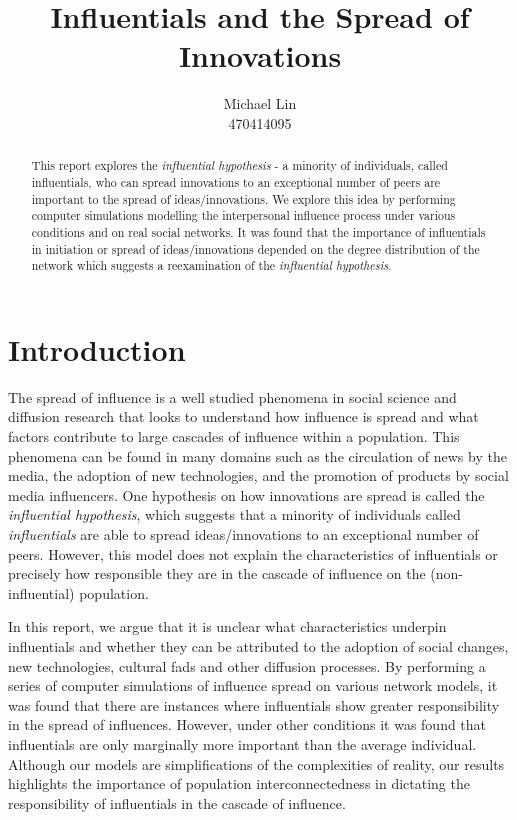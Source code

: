 \documentclass[10pt, oneside, reqno]{amsart}
\title{Influentials and the Spread of Innovations}                                %
\author{Michael Lin\\470414095}
\theoremstyle{plain}%
\theoremstyle{definition}
\theoremstyle{remark}
\begin{document}
\vspace*{-1.5cm}
\begin{abstract}
    This report explores the \textit{influential hypothesis} - a minority of individuals, called 
    influentials, who can spread innovations to an exceptional number of peers are important to 
    the spread of ideas/innovations. We explore this idea by performing computer simulations 
    modelling the interpersonal influence process under various conditions and on real social networks. 
    It was found that the importance of influentials in initiation or spread of ideas/innovations depended on the degree distribution of the network which suggests a reexamination of the \textit{influential hypothesis}.
\end{abstract}
\maketitle 

\section{Introduction}

The spread of influence is a well studied phenomena in social science and diffusion research 
that looks to understand how influence is spread and what factors contribute to large cascades
of influence within a population. 
This phenomena can be found in many domains such as the circulation of news by the media, the 
adoption of new technologies, and the promotion of products by social media influencers.
One hypothesis on how innovations are spread is called the \textit{influential hypothesis}\cite{Influential},
which suggests that a minority of individuals called \textit{influentials} are able to spread 
ideas/innovations to an exceptional number of peers. 
However, this model does not explain the characteristics of influentials or precisely how 
responsible they are in the cascade of influence on the (non-influential) population.

In this report, we argue that it is unclear what characteristics underpin influentials and 
whether they can be attributed to the adoption of social changes, new technologies, cultural 
fads and other diffusion processes.
By performing a series of computer simulations of influence spread on various network models, it was found that 
there are instances where influentials show greater responsibility in the spread of influences.
However, under other conditions it was found that influentials are only marginally more important
than the average individual. 
Although our models are simplifications of the complexities of reality, our results highlights
the importance of population interconnectedness in dictating the responsibility of influentials
in the cascade of influence.
\end{document}
